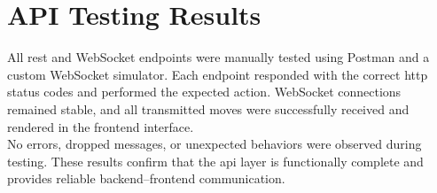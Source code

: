 
\section{API Testing Results}

All \gls{rest} and WebSocket endpoints were manually tested using Postman and a custom WebSocket simulator. Each endpoint responded with the correct \gls{http} status codes and performed the expected action. WebSocket connections remained stable, and all transmitted moves were successfully received and rendered in the frontend interface.\\

No errors, dropped messages, or unexpected behaviors were observed during testing. These results confirm that the \gls{api} layer is functionally complete and provides reliable backend–frontend communication.

